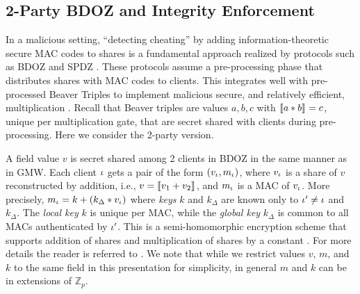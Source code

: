 \subsection{2-Party BDOZ and Integrity Enforcement}
\label{section-example-bdoz}



In a malicious setting, ``detecting cheating'' by adding
information-theoretic secure MAC codes to shares is a fundamental
approach realized by protocols such as BDOZ \cite{XXX} and SPDZ
\cite{XXX}.  These protocols assume a pre-processing phase that
distributes shares with MAC codes to clients.  This integrates well
with pre-processed Beaver Triples to implement malicious secure, and
relatively efficient, multiplication \cite{XXX}. Recall
that Beaver triples are values $a,b,c$ with $\llbracket a * b \rrbracket_{} = c$,
unique per multiplication gate, that are secret shared with clients
during pre-processing. Here we consider the 2-party version.

A field value $v$ is secret shared among 2 clients in BDOZ in the same
manner as in GMW.  Each client $\iota$ gets a pair of the form
$(v_\iota,m_\iota)$, where $v_\iota$ is a share of $v$ reconstructed by
addition, i.e., $v = \llbracket v_1 + v_2 \rrbracket_{}$, and $m_\iota$ is a MAC of
$v_\iota$.  More precisely, $m_\iota = k + (k_\Delta * v_\iota)$ where
\emph{keys} $k$ and $k_\Delta$ are known only to $\iota' \ne \iota$ and
$k_\Delta$. The \emph{local key} $k$ is unique per MAC, while the
\emph{global key} $k_\Delta$ is common to all MACs authenticated by
$\iota'$. This is a semi-homomorphic encryption scheme that supports
addition of shares and multiplication of shares by a constant
\cite{XXX}. For more details the reader is referred to \cite{XXX}. We
note that while we restrict values $v$, $m$, and $k$ to the same field
in this presentation for simplicity, in general $m$ and $k$ can be in
extensions of $\mathbb{Z}_p$.

